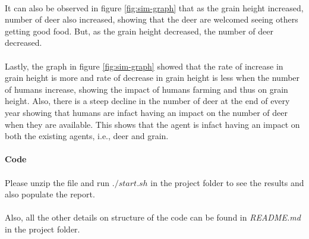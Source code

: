 \documentclass[notitlepage]{report}
\begin{document}
	\paragraph{}
	It can also be observed in figure \ref{fig:sim-graph} that as the grain height increased, number of deer also increased, showing that the deer are welcomed seeing others getting good food. But, as the grain height decreased, the number of deer decreased.
	\paragraph{}
	Lastly, the graph in figure \ref{fig:sim-graph} showed that the rate of increase in grain height is more and rate of decrease in grain height is less when the number of humans increase, showing the impact of humans farming and thus on grain height. Also, there is a steep decline in the number of deer at the end of every year showing that humans are infact having an impact on the number of deer when they are available. This shows that the agent is infact having an impact on both the existing agents, i.e., deer and grain.
	
	\paragraph{Code}
	\paragraph{} Please unzip the file and run $./start.sh$ in the project folder to see the results and also populate the report.
	\paragraph{} Also, all the other details on structure of the code can be found in \textit{README.md} in the project folder.
\end{document}
